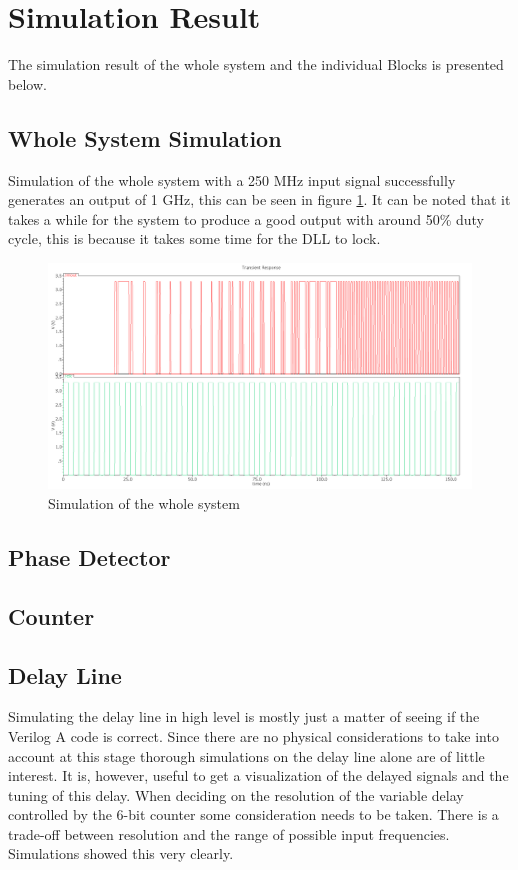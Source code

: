 \documentclass[a4paper,12pt]{article} \usepackage{graphicx}
\begin{document}
\section{Simulation Result}
The simulation result of the whole system and the individual Blocks is
presented below.
\subsection{Whole System Simulation}
Simulation of the whole system with a 250 MHz input signal successfully
generates an output of 1 GHz, this can be seen in figure \ref{fig:high_sim}.
It can be noted that it takes a while for the system to produce a good output
with around 50\% duty cycle, this is because it takes some time for the DLL
to lock.
\begin{figure}[hb]
        \centering
        \includegraphics[width=\textwidth]{../Bilder/high_level_sim.png}
        \caption{Simulation of the whole system}
        \label{fig:high_sim}
\end{figure}

\subsection{Phase Detector}
\subsection{Counter}
\subsection{Delay Line}
Simulating the delay line in high level is mostly just a matter of
seeing if the Verilog A code is correct. Since there are no physical
considerations to take into account at this stage thorough simulations
on the delay line alone are of little interest. It is, however, useful
to get a visualization of the delayed signals and the tuning of this
delay. When deciding on the resolution of the variable delay
controlled by the 6-bit counter some consideration needs to be taken. 
There is a trade-off between resolution and the
range of possible input frequencies. Simulations showed this very
clearly. 
\end{document}
